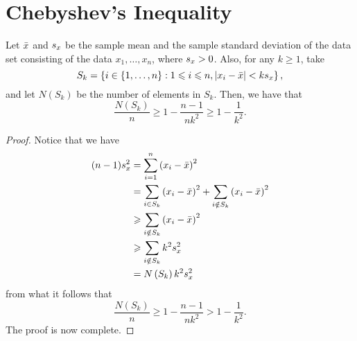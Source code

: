 \section{Chebyshev's Inequality}\label{sec:chebyshevs-inequality}

\begin{theorem}\label{thm:chebyshevs-inequality}
  Let \(\bar{x}\) and \(s_{x}\) be the sample mean
  and the sample standard deviation of the data set consisting of the data
  \(x_{1},\ldots,x_{n}\), where \(s_{x}>0\). Also, for any
  \(k\geqslant{1}\), take
  \[
    S_{k}
    =
    \left\{
      i\in{\left\{1,\ldots,n\right\}}
      :
      1\leqslant{i}\leqslant{n},
      \lvert x_{i}-\bar{x}\rvert<ks_{x}
      \right\},
  \]
  and let \(N\left(S_{k}\right)\) be the number of elements in \(S_{k}\).
  Then, we have that
  \[
    \frac{N\left(S_{k}\right)}{n}
    \geqslant
    1-\frac{n-1}{nk^{2}}
    \geqslant
    1-\frac{1}{k^{2}}.
  \]
\end{theorem}

\begin{proof}
  Notice that we have
  \begin{align*}
    (n-1)s_{x}^{2}
    &=
    \sum_{i=1}^{n}\left(x_{i}-\bar{x}\right)^{2}
    \\
    &=
    \sum_{i\in{S_{k}}}\left(x_{i}-\bar{x}\right)^{2}
    +
    \sum_{i\notin{S_{k}}}\left(x_{i}-\bar{x}\right)^{2}
    \\
    &\geqslant
    \sum_{i\notin{S_{k}}}\left(x_{i}-\bar{x}\right)^{2}
    \\
    &\geqslant
    \sum_{i\notin{S_{k}}}k^{2}s_{x}^{2}
    \\
    &=N\left(S_{k}\right)k^{2}s_{x}^{2}
  \end{align*}
  from what it follows that
  \[
    \frac{N\left(S_{k}\right)}{n}
    \geqslant
    1-\frac{n-1}{nk^{2}}
    >
    1-\frac{1}{k^{2}}.
  \]
  The proof is now complete.
\end{proof}

